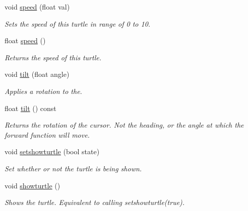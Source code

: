 \begin{DoxyCompactItemize}
void \hyperlink{classcturtle_1_1Turtle_a5f2010373aeb82207975e9f1b4168747}{speed} (float val)
\begin{DoxyCompactList}\small\item\em Sets the speed of this turtle in range of 0 to 10. \end{DoxyCompactList}\item 
\mbox{\label{classcturtle_1_1Turtle_af018ea1fa9eb9be80fdf53fabcb668eb}} 
float \hyperlink{classcturtle_1_1Turtle_af018ea1fa9eb9be80fdf53fabcb668eb}{speed} ()
\begin{DoxyCompactList}\small\item\em Returns the speed of this turtle. \end{DoxyCompactList}\item 
\mbox{\label{classcturtle_1_1Turtle_ae3e48f309eaea7b4426ad1a173f15ef5}} 
void \hyperlink{classcturtle_1_1Turtle_ae3e48f309eaea7b4426ad1a173f15ef5}{tilt} (float angle)
\begin{DoxyCompactList}\small\item\em Applies a rotation to the. \end{DoxyCompactList}\item 
\mbox{\label{classcturtle_1_1Turtle_aec48e043d9f3a259d7500d94323d6890}} 
float \hyperlink{classcturtle_1_1Turtle_aec48e043d9f3a259d7500d94323d6890}{tilt} () const
\begin{DoxyCompactList}\small\item\em Returns the rotation of the cursor. Not the heading, or the angle at which the forward function will move. \end{DoxyCompactList}\item 
void \hyperlink{classcturtle_1_1Turtle_a9e83fdd5c469e4863cf9b460e4d29130}{setshowturtle} (bool state)
\begin{DoxyCompactList}\small\item\em Set whether or not the turtle is being shown. \end{DoxyCompactList}\item 
void \hyperlink{classcturtle_1_1Turtle_ac676ff53f6393c70d665053cab1d67c5}{showturtle} ()
\begin{DoxyCompactList}\small\item\em Shows the turtle. Equivalent to calling setshowturtle(true). \end{DoxyCompactList}\item 

\end{DoxyCompactItemize}
